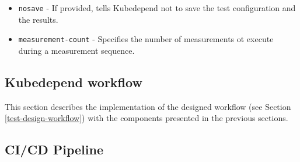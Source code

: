 \begin{itemize}
	\item \texttt{nosave} - If provided, tells Kubedepend not to save the test configuration and the results.
	\item \texttt{measurement-count} - Specifies the number of measurements ot execute during a measurement sequence.
\end{itemize}

\subsection{Kubedepend workflow}




This section describes the implementation of the designed workflow (see Section \ref{test-design-workflow}) with the components presented in the previous sections.

\subsection{CI/CD Pipeline} \label{cicd}

